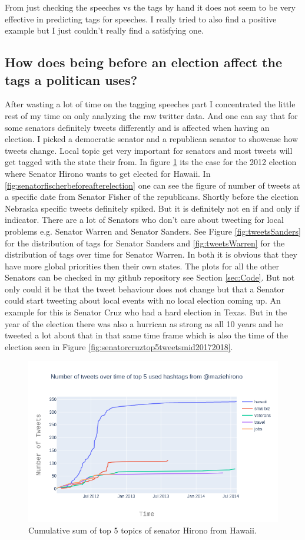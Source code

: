 \documentclass[10pt,conference,compsocconf]{IEEEtran}
\begin{document}
From just checking the speeches vs the tags by hand it does not seem to be very effective in predicting tags for speeches. 
I really tried to also find a positive example but I just couldn't really find a satisfying one.

 
\subsection{How does being before an election affect the tags a politican uses? }
After wasting a lot of time on the tagging speeches part I concentrated the little rest of my time on only analyzing the raw twitter data. And one can say that for some senators definitely tweets differently and is affected when having an election. I picked a democratic senator and a republican senator to showcase how tweets change. Local topic get very important for senators and most tweets will get tagged with the state their from. In figure \ref{fig:hironobeforeafterelection} its the case for the 2012 election where Senator Hirono wants to get elected for Hawaii. In \ref{fig:senatorfischerbeforeafterelection} one can see the figure of number of tweets at a specific date from Senator Fisher of the republicans. Shortly before the election Nebraska specific tweets definitely spiked. But it is definitely not en if and only if indicator.  There are a lot of Senators who don't care about tweeting for local problems e.g. Senator Warren and Senator Sanders. See Figure \ref{fig:tweetsSanders} for the distribution of tags for Senator Sanders and \ref{fig:tweetsWarren} for the distribution of tags over time for Senator Warren. In both it is obvious that they have more global priorities then their own states. The plots for all the other Senators can be checked in my github repository see Section \ref{sec:Code}. But not only could it be that the tweet behaviour does not change but that a Senator could start tweeting about local events with no local election coming up. An example for this is Senator Cruz who had a hard election in Texas. But in the year of the election there was also a hurrican as strong as all 10 years and he tweeted a lot about that in that same time frame which is also the time of the election seen in Figure \ref{fig:senatorcruztop5tweetsmid20172018}.
 
\begin{figure}
	\centering
	\includegraphics[width=0.7\linewidth]{images/hirono_before_after_election}
	\caption{Cumulative sum of top 5 topics of senator Hirono from Hawaii. }
	\label{fig:hironobeforeafterelection}
\end{figure}
\end{document}
